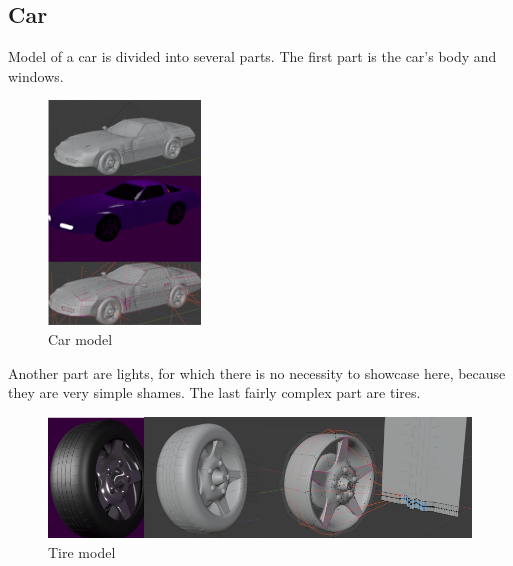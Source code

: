 \documentclass[12pt,a4paper,titlepage,final]{report}
\begin{document}
\subsection{Car}
Model of a car is divided into several parts. The first part is the car's body and windows.
\begin{figure}[H]
    \centering
    \includegraphics{images/car_render_small.png}
    \caption{Car model}
    \label{fig:car_model}
\end{figure}

Another part are lights, for which there is no necessity to showcase here, because they are very simple shames. The last fairly complex part are tires.
\begin{figure}[H]
    \centering
    \includegraphics{images/tires_render_small.png}
    \caption{Tire model}
    \label{fig:tire_model}
\end{figure}
\end{document}
